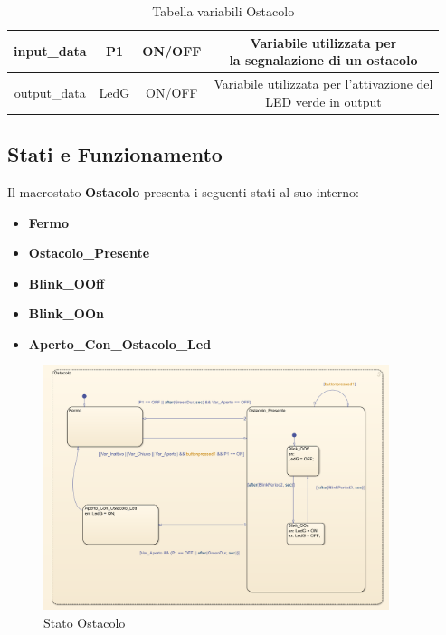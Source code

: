 \begin{table}[H]
\begin{tabular}{ | c | c | c | c |}
                        input\_data & P1 & ON/OFF & \makecell{Variabile utilizzata per \\ la segnalazione di un ostacolo} \\ 
                        \hline
                        
                        output\_data & LedG & ON/OFF & \makecell{Variabile utilizzata per l'attivazione del \\ LED verde in output} \\ 
                        \hline
                    \end{tabular}
                \caption{Tabella variabili Ostacolo}
            \end{table}

        \subsection{Stati e Funzionamento}
            Il macrostato \textbf{Ostacolo} presenta i seguenti stati al suo interno:
            
            \begin{itemize}
                \item \textbf{Fermo}
                
                \item \textbf{Ostacolo\_Presente}
                
                \item \textbf{Blink\_OOff}
                
                \item \textbf{Blink\_OOn}
                
                \item \textbf{Aperto\_Con\_Ostacolo\_Led}
            \end{itemize}

            \begin{figure}[H]
                \centering
                \includegraphics[width=0.9\textwidth]{figures/obstacle.png}
                \caption{Stato Ostacolo}
                \label{obstacle}
            \end{figure}

